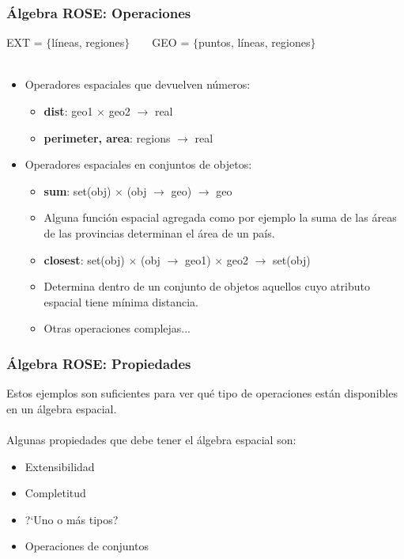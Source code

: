 \documentclass[12pt]{beamer}
\begin{document}
\begin{frame}
\frametitle{\'Algebra ROSE: Operaciones}
EXT = $\lbrace$l\'ineas, regiones$\rbrace$\ \ \ \ GEO = $\lbrace$puntos, l\'ineas, regiones$\rbrace$\\
\ \\
\begin{itemize}
\item Operadores espaciales que devuelven n\'umeros:\\
\begin{itemize}
\item \textbf{dist}: geo1 $\times$ geo2 $\rightarrow$ real
\item \textbf{perimeter, area}: regions $\rightarrow$ real
\end{itemize}
\item Operadores espaciales en conjuntos de objetos:\\
\begin{itemize}
\item \textbf{sum}: set(obj) $\times$ (obj $\rightarrow$ geo) $\rightarrow$ geo
\item Alguna funci\'on espacial agregada como por ejemplo la suma de las \'areas de las provincias determinan el \'area de un pa\'is.
\item \textbf{closest}: set(obj) $\times$ (obj $\rightarrow$ geo1) $\times$ geo2 $\rightarrow$ set(obj)
\item Determina dentro de un conjunto de objetos aquellos cuyo atributo espacial tiene m\'inima distancia.
\item Otras operaciones complejas...
\end{itemize}
\end{itemize}
\end{frame}

\begin{frame}
\frametitle{\'Algebra ROSE: Propiedades}
Estos ejemplos son suficientes para ver qu\'e tipo de operaciones est\'an disponibles en un \'algebra espacial.\\
\ \\
Algunas propiedades que debe tener el \'algebra espacial son:\\
\begin{itemize}
\item Extensibilidad
\item Completitud
\item ?`Uno o m\'as tipos?
\item Operaciones de conjuntos
\end{itemize}
\end{frame}
\end{document}

